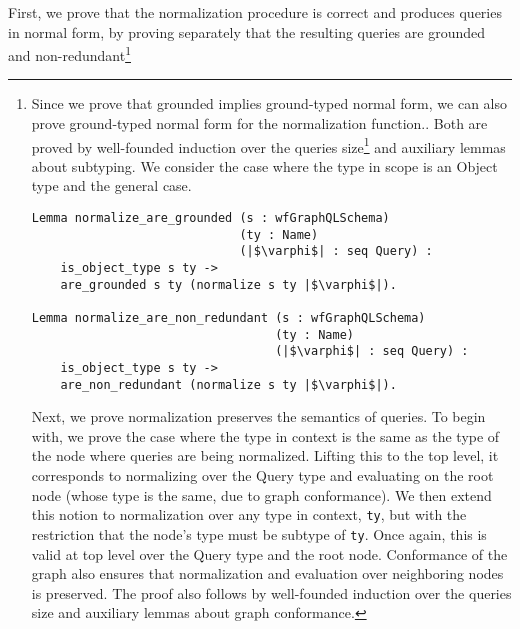 First, we prove that the normalization procedure is correct  and produces queries in normal form, by proving separately that the resulting queries are grounded and non-redundant\footnote{Since we prove that grounded implies ground-typed normal form, we can also prove ground-typed normal form for the normalization function.. Both are proved by well-founded induction over the queries size\footnote{The notion of size includes the length of the list as well as the depth of the query tree.} and auxiliary lemmas about subtyping.  We consider the case where the type in scope is an Object type  and the general case. 

\begin{verbatim}
Lemma normalize_are_grounded (s : wfGraphQLSchema)
                             (ty : Name)
                             (|$\varphi$| : seq Query) :
    is_object_type s ty ->
    are_grounded s ty (normalize s ty |$\varphi$|).

Lemma normalize_are_non_redundant (s : wfGraphQLSchema)
                                  (ty : Name)
                                  (|$\varphi$| : seq Query) :
    is_object_type s ty ->
    are_non_redundant (normalize s ty |$\varphi$|).

\end{verbatim}

Next, we prove normalization preserves the semantics of queries. To begin with, we prove the case where the type in context is the same as the type of the node where queries are being normalized. Lifting this to the top level, it corresponds to normalizing over the Query type and evaluating on the root node (whose type is the same, due to graph conformance). We then extend this notion to normalization over any type in context, \texttt{ty}, but with the restriction that the node's type must be subtype of \texttt{ty}. Once again, this is valid at top level over the Query type and the root node. Conformance of the graph also ensures that normalization and evaluation over neighboring nodes is preserved. The proof also follows by well-founded induction over the queries size and auxiliary lemmas about graph conformance.

}

